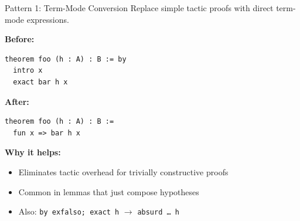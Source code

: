 \documentclass[aspectratio=169,10pt]{beamer}
\begin{document}

\begin{frame}[fragile]{Pattern 1: Term-Mode Conversion}
    \vspace{-0.3em}
    Replace simple tactic proofs with direct term-mode expressions.

    \vspace{0.3em}
    \textbf{\textcolor{softred}{Before:}}
    \begin{lstlisting}
theorem foo (h : A) : B := by
  intro x
  exact bar h x
    \end{lstlisting}

    \textbf{\textcolor{leangreen}{After:}}
    \begin{lstlisting}
theorem foo (h : A) : B :=
  fun x => bar h x
    \end{lstlisting}

    \vspace{0.5em}
    {\small
    \textbf{Why it helps:}
    \begin{itemize}\itemsep0.1em
        \item Eliminates tactic overhead for trivially constructive proofs
        \item Common in lemmas that just compose hypotheses
        \item Also: \texttt{by exfalso; exact h} $\to$ \texttt{absurd \ldots\ h}
    \end{itemize}
    }
\end{frame}
\end{document}
